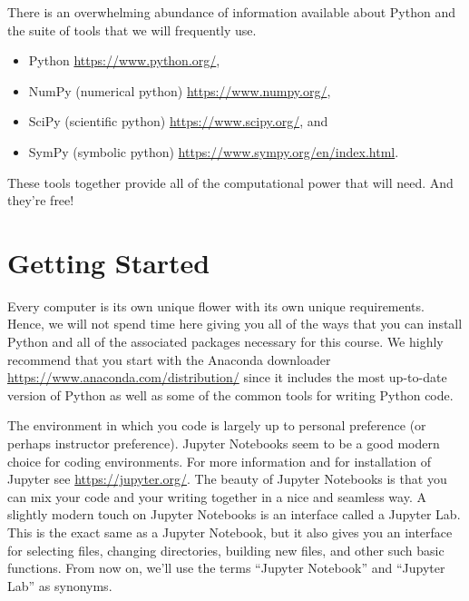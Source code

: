 There is an overwhelming abundance of information available about Python and the suite of
tools that we will frequently use.
\begin{itemize}
    \item Python \href{https://www.python.org/}{https://www.python.org/},
    \item NumPy (numerical python) \href{https://www.numpy.org/}{https://www.numpy.org/},
    \item SciPy (scientific python) \href{https://www.scipy.org/}{https://www.scipy.org/}, and
    \item SymPy (symbolic python)
        \href{https://www.sympy.org/en/index.html}{https://www.sympy.org/en/index.html}.
\end{itemize}
These tools together provide all of the computational power that will need.  And they're free!

\section{Getting Started}
Every computer is its own unique flower with its own unique requirements.  Hence, we will
not spend time here giving you all of the ways that you can install Python and all of the
associated packages necessary for this course.  We highly recommend that you start with
the Anaconda downloader
\href{https://www.anaconda.com/distribution/}{https://www.anaconda.com/distribution/}
since it includes the most up-to-date version of Python as well as some of the common
tools for writing Python code. 

The environment in which you code is largely up to personal preference
(or perhaps instructor preference).  Jupyter Notebooks seem to be a good modern choice for
coding environments.  For more information and for installation of Jupyter see
\href{https://jupyter.org/}{https://jupyter.org/}.  The beauty of Jupyter Notebooks is
that you can mix your code and your writing together in a nice and seamless way.  A
slightly modern touch on Jupyter Notebooks is an interface called a Jupyter Lab.  This is
the exact same as a Jupyter Notebook, but it also gives you an interface for selecting
files, changing directories, building new files, and other such basic functions.  From now
on, we'll use the terms ``Jupyter Notebook'' and ``Jupyter Lab'' as synonyms.

